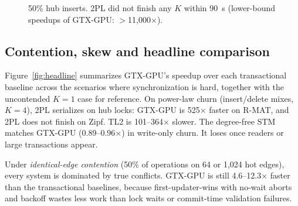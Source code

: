 \documentclass[sigconf,nonacm]{acmart}
\newcommand{\sys}{GTX-GPU}
\begin{document}
\begin{figure}[t]
\centering
{}
\caption{50\% hub inserts. 2PL did not finish any $K$ within 90~s (lower-bound speedups of \sys{}:
$>$11,000$\times$).}
\label{fig:ksweep-h}
\end{figure}

\subsection{Contention, skew and headline comparison}
Figure~\ref{fig:headline} summarizes \sys{}'s speedup over each transactional baseline across the scenarios where
synchronization is hard, together with the uncontended $K{=}1$ case for reference. On power-law churn
(insert/delete mixes, $K{=}4$), 2PL serializes on hub locks: \sys{} is 525$\times$ faster on R-MAT, and 2PL does
not finish on Zipf. TL2 is 101--364$\times$ slower. The degree-free STM matches \sys{} (0.89--0.96$\times$) in
write-only churn. It loses once readers or large transactions appear.

Under \emph{identical-edge contention} (50\% of operations on 64 or 1,024 hot edges), every system is dominated by
true conflicts. \sys{} is still 4.6--12.3$\times$ faster than the transactional baselines, because
first-updater-wins with no-wait aborts and backoff wastes less work than lock waits or commit-time validation
failures.
\end{document}
